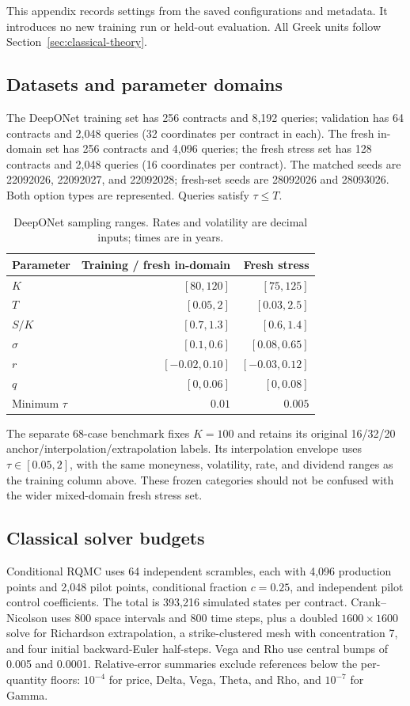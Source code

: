 \documentclass[11pt,a4paper]{article}
\begin{document}
This appendix records settings from the saved configurations and metadata. It introduces no new training run or held-out evaluation. All Greek units follow Section~\ref{sec:classical-theory}.

\subsection{Datasets and parameter domains}
The DeepONet training set has 256 contracts and 8,192 queries; validation has 64 contracts and 2,048 queries (32 coordinates per contract in each). The fresh in-domain set has 256 contracts and 4,096 queries; the fresh stress set has 128 contracts and 2,048 queries (16 coordinates per contract). The matched seeds are 22092026, 22092027, and 22092028; fresh-set seeds are 28092026 and 28093026. Both option types are represented. Queries satisfy $\tau\le T$.

\begin{table}[!ht]\centering\small
\caption{DeepONet sampling ranges. Rates and volatility are decimal inputs; times are in years.}
\begin{tabular}{lrr}\toprule
Parameter & Training / fresh in-domain & Fresh stress\\\midrule
$K$ & $[80,120]$ & $[75,125]$\\
$T$ & $[0.05,2]$ & $[0.03,2.5]$\\
$S/K$ & $[0.7,1.3]$ & $[0.6,1.4]$\\
$\sigma$ & $[0.1,0.6]$ & $[0.08,0.65]$\\
$r$ & $[-0.02,0.10]$ & $[-0.03,0.12]$\\
$q$ & $[0,0.06]$ & $[0,0.08]$\\
Minimum $\tau$ & $0.01$ & $0.005$\\\bottomrule
\end{tabular}\end{table}

The separate 68-case benchmark fixes $K=100$ and retains its original 16/32/20 anchor/interpolation/extrapolation labels. Its interpolation envelope uses $\tau\in[0.05,2]$, with the same moneyness, volatility, rate, and dividend ranges as the training column above. These frozen categories should not be confused with the wider mixed-domain fresh stress set.

\subsection{Classical solver budgets}
Conditional RQMC uses 64 independent scrambles, each with 4,096 production points and 2,048 pilot points, conditional fraction $c=0.25$, and independent pilot control coefficients. The total is 393,216 simulated states per contract. Crank--Nicolson uses 800 space intervals and 800 time steps, plus a doubled $1600\times1600$ solve for Richardson extrapolation, a strike-clustered mesh with concentration 7, and four initial backward-Euler half-steps. Vega and Rho use central bumps of 0.005 and 0.0001. Relative-error summaries exclude references below the per-quantity floors: $10^{-4}$ for price, Delta, Vega, Theta, and Rho, and $10^{-7}$ for Gamma.
\end{document}
